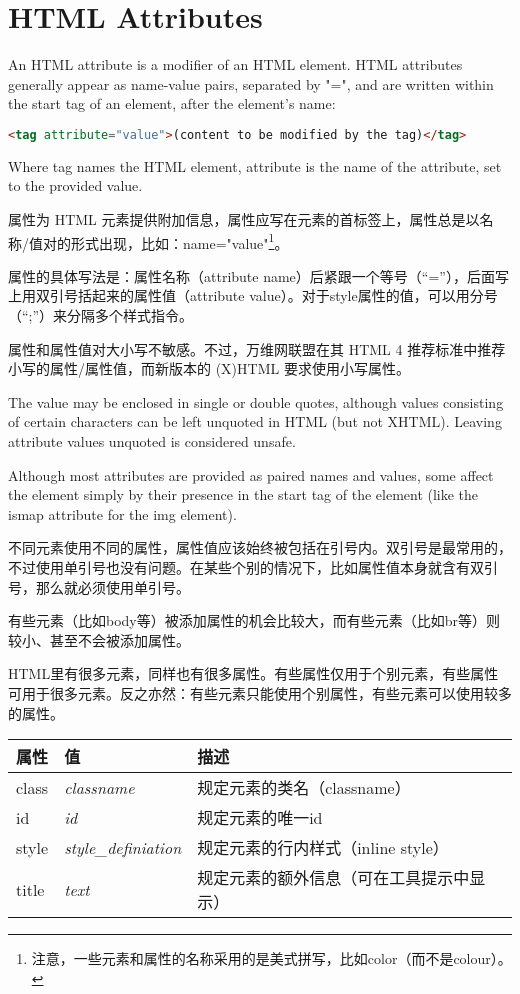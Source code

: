 \part{HTML Attributes}

An HTML attribute is a modifier of an HTML element. HTML attributes generally appear as name-value pairs, separated by "=", and are written within the start tag of an element, after the element's name:

\begin{lstlisting}[language=HTML]
	<tag attribute="value">(content to be modified by the tag)</tag>
\end{lstlisting}

Where tag names the HTML element, attribute is the name of the attribute, set to the provided value.

属性为 HTML 元素提供附加信息，属性应写在元素的首标签上，属性总是以名称/值对的形式出现，比如：name="value"\footnote{注意，一些元素和属性的名称采用的是美式拼写，比如color（而不是colour）。}。

属性的具体写法是：属性名称（attribute name）后紧跟一个等号（“=”），后面写上用双引号括起来的属性值（attribute value）。对于style属性的值，可以用分号（“;”）来分隔多个样式指令。


属性和属性值对大小写不敏感。不过，万维网联盟在其 HTML 4 推荐标准中推荐小写的属性/属性值，而新版本的 (X)HTML 要求使用小写属性。


The value may be enclosed in single or double quotes, although values consisting of certain characters can be left unquoted in HTML (but not XHTML). Leaving attribute values unquoted is considered unsafe.

Although most attributes are provided as paired names and values, some affect the element simply by their presence in the start tag of the element (like the ismap attribute for the img element).

不同元素使用不同的属性，属性值应该始终被包括在引号内。双引号是最常用的，不过使用单引号也没有问题。在某些个别的情况下，比如属性值本身就含有双引号，那么就必须使用单引号。

有些元素（比如body等）被添加属性的机会比较大，而有些元素（比如br等）则较小、甚至不会被添加属性。

HTML里有很多元素，同样也有很多属性。有些属性仅用于个别元素，有些属性可用于很多元素。反之亦然：有些元素只能使用个别属性，有些元素可以使用较多的属性。

\begin{table}[!h]
\centering
\begin{tabular}{|l|l|l|}
\hline
属性		&	值			& 描述	\\
\hline
class	&	\textsl{classname}	& 规定元素的类名（classname）	\\
\hline
id		& 	\textsl{id}			& 规定元素的唯一id			\\
\hline
style	& 	\textsl{style\_definiation} & 规定元素的行内样式（inline style）\\
\hline
title		& 	\textsl{text}			& 规定元素的额外信息（可在工具提示中显示）\\
\hline
\end{tabular}
\end{table}

